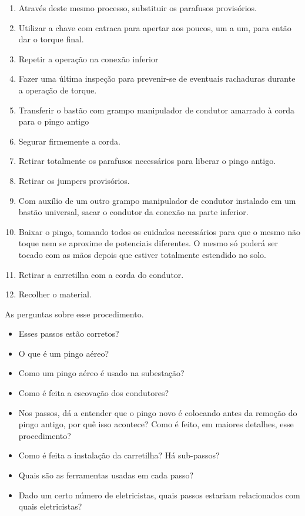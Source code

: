 \begin{enumerate}
	\item Através deste mesmo processo, substituir os parafusos provisórios. 
	\item Utilizar a chave com catraca para apertar aos poucos, um a um, para então dar o torque final.
	\item Repetir a operação na conexão inferior
	\item Fazer uma última inspeção para prevenir-se de eventuais rachaduras durante a operação de torque. 
	\item Transferir o bastão com grampo manipulador de condutor amarrado à corda para o pingo antigo
	\item Segurar firmemente a corda.
	\item Retirar totalmente os parafusos necessários para liberar o pingo antigo. 
	\item Retirar os jumpers provisórios.
	\item Com auxílio de um outro grampo manipulador de condutor instalado em um bastão universal, sacar o condutor da conexão na parte inferior.
	\item Baixar o pingo, tomando todos os cuidados necessários para que o mesmo não toque nem se aproxime de potenciais diferentes. O mesmo só poderá ser tocado com as mãos depois que estiver totalmente estendido no solo.
	\item Retirar a carretilha com a corda do condutor.
	\item Recolher o material.
\end{enumerate}

As perguntas sobre esse procedimento. 

\begin{itemize}
    \item Esses passos estão corretos?
    \item O que é um pingo aéreo? 
    \item Como um pingo aéreo é usado na subestação?
    \item Como é feita a escovação dos condutores?
    \item Nos passos, dá a entender que o pingo novo é colocando antes da remoção do pingo antigo, por quê isso acontece? Como é feito, em maiores detalhes, esse procedimento?
    \item Como é feita a instalação da carretilha? Há sub-passos?
    \item Quais são as ferramentas usadas em cada passo?
    \item Dado um certo número de eletricistas, quais passos estariam relacionados com quais eletricistas?
\end{itemize}

